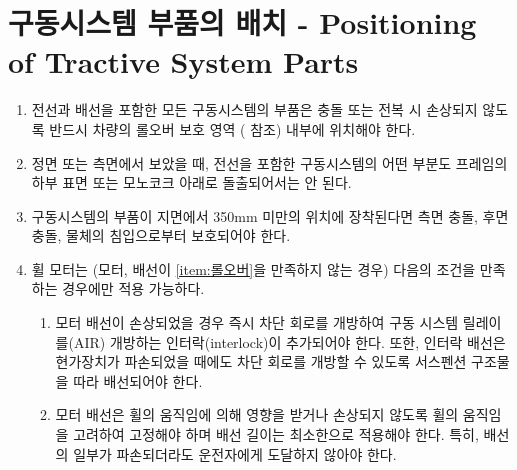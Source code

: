 \documentclass[final,a4paper,10pt]{report}
\begin{document}
\section{구동시스템 부품의 배치 - Positioning of Tractive System Parts}\label{rule:formula-technical.tractive-system-positioning}
\begin{enumerate}
  \item\label{rule:formula-technical.tractive-system-positioning.within-rollover-envelope} 전선과 배선을 포함한 모든 구동시스템의 부품은 충돌 또는 전복 시 손상되지 않도록 반드시 차량의 롤오버 보호 영역 ( 참조) 내부에 위치해야 한다. \label{item:롤오버}
  \item\label{rule:formula-technical.tractive-system-positioning.no-protrusion-below-frame} 정면 또는 측면에서 보았을 때, 전선을 포함한 구동시스템의 어떤 부분도 프레임의 하부 표면 또는 모노코크 아래로 돌출되어서는 안 된다.


  \item\label{rule:formula-technical.tractive-system-positioning.protection-below-350mm} 구동시스템의 부품이 지면에서 350mm 미만의 위치에 장착된다면 측면 충돌, 후면 충돌, 물체의 침입으로부터 보호되어야 한다.
  \item\label{rule:formula-technical.tractive-system-positioning.wheel-motor-exception} 휠 모터는 (모터, 배선이 \ref{item:롤오버}을 만족하지 않는 경우) 다음의 조건을 만족하는 경우에만 적용 가능하다. \label{item:휠 모터}
    \begin{enumerate}
      \item\label{rule:formula-technical.tractive-system-positioning.wheel-motor-exception.damage-triggers-interlock} 모터 배선이 손상되었을 경우 즉시 차단 회로를 개방하여 구동 시스템 릴레이를(AIR) 개방하는 인터락(interlock)이 추가되어야 한다. {\color{blue}또한, 인터락 배선은 현가장치가 파손되었을 때에도 차단 회로를 개방할 수 있도록 서스펜션 구조물을 따라 배선되어야 한다.}
      \item\label{rule:formula-technical.tractive-system-positioning.wheel-motor-exception.wiring-secured-minimal-length} 모터 배선은 휠의 움직임에 의해 영향을 받거나 손상되지 않도록 휠의 움직임을 고려하여 고정해야 하며 배선 길이는 최소한으로 적용해야 한다. {\color{blue}특히, 배선의 일부가 파손되더라도 운전자에게 도달하지 않아야 한다.}
    \end{enumerate}
\end{enumerate}
\end{document}
